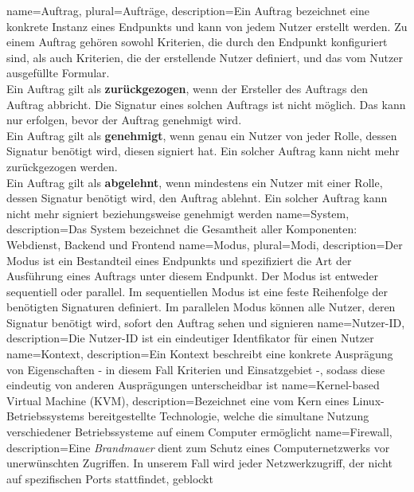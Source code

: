 {
	name=Auftrag,
	plural=Aufträge,
	description={Ein Auftrag bezeichnet eine konkrete Instanz eines Endpunkts und kann von jedem Nutzer erstellt werden. Zu einem Auftrag gehören sowohl Kriterien, die durch den Endpunkt konfiguriert sind, als auch Kriterien, die der erstellende Nutzer definiert, und das vom Nutzer ausgefüllte Formular. \\
	Ein Auftrag gilt als \textbf{zurückgezogen}, wenn der Ersteller des Auftrags den Auftrag abbricht. Die Signatur eines solchen Auftrags ist nicht möglich. Das kann nur erfolgen, bevor der Auftrag genehmigt wird. \\
	Ein Auftrag gilt als \textbf{genehmigt}, wenn genau ein Nutzer von jeder Rolle, dessen Signatur benötigt wird, diesen signiert hat. Ein solcher Auftrag kann nicht mehr zurückgezogen werden. \\
	Ein Auftrag gilt als \textbf{abgelehnt}, wenn mindestens ein Nutzer mit einer Rolle, dessen Signatur benötigt wird, den Auftrag ablehnt. Ein solcher Auftrag kann nicht mehr signiert beziehungsweise genehmigt werden}
}
{
	name=System,
	description={Das System bezeichnet die Gesamtheit aller Komponenten: Webdienst, Backend und Frontend}
}
{
	name=Modus,
	plural=Modi,
	description={Der Modus ist ein Bestandteil eines Endpunkts und spezifiziert die Art der Ausführung eines Auftrags unter diesem Endpunkt. Der Modus ist entweder sequentiell oder parallel. Im sequentiellen Modus ist eine feste Reihenfolge der benötigten Signaturen definiert. Im parallelen Modus können alle Nutzer, deren Signatur benötigt wird, sofort den Auftrag sehen und signieren}
}
{
	name=Nutzer-ID,
	description={Die Nutzer-ID ist ein eindeutiger Identfikator für einen Nutzer}
}
{
	name=Kontext,
	description={Ein Kontext beschreibt eine konkrete Ausprägung von Eigenschaften - in diesem Fall Kriterien und Einsatzgebiet -, sodass diese eindeutig von anderen Ausprägungen unterscheidbar ist}
}
{
	name=Kernel-based Virtual Machine (KVM),
	description={Bezeichnet eine vom Kern eines Linux-Be\-triebs\-sys\-tems bereitgestellte Technologie, welche die simultane Nutzung verschiedener Betriebssysteme auf einem Computer ermöglicht}
}
{
	name=Firewall,
	description={Eine \textit{Brandmauer} dient zum Schutz eines Computernetzwerks vor unerwünschten Zugriffen. In unserem Fall wird jeder Netzwerkzugriff, der nicht auf spezifischen Ports stattfindet, geblockt}
}
